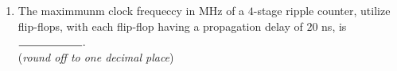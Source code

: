 \documentclass{article}
\begin{document}
\begin{enumerate}
	\item The maximmunm clock frequeccy in MHz of a $4$-stage ripple counter, utilize flip-flops, with each flip-flop having a propagation delay of $20$ ns, is $\rule{2cm}{0.15mm}$.\\
(\textit{round off to one decimal place})
\end{enumerate}
\end{document}
